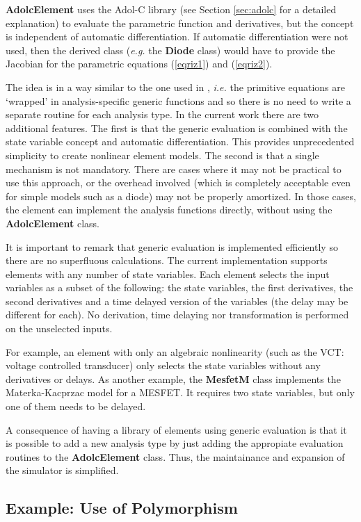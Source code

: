 {\bf AdolcElement} uses the Adol-C library (see Section
\ref{sec:adolc} for a detailed explanation) to evaluate the parametric
function and derivatives, but the concept is independent of automatic
differentiation. If automatic differentiation were not used, then the
derived class (\emph{e.g.} the {\bf Diode} class) would have to
provide the Jacobian for the parametric equations (\ref{eqriz1}) and
(\ref{eqriz2}).

The idea is in a way similar to the one used in \cite{aplac2},
\emph{i.e.} the primitive equations are `wrapped' in analysis-specific
generic functions and so there is no need to write a separate routine
for each analysis type. In the current work there are two additional
features. The first is that the generic evaluation is combined with
the state variable concept and automatic differentiation. This
provides unprecedented simplicity to create nonlinear element models.
The second is that a single mechanism is not mandatory. There are
cases where it may not be practical to use this approach, or the
overhead involved (which is completely acceptable even for simple
models such as a diode) may not be properly amortized. In those cases,
the element can implement the analysis functions directly, without
using the {\bf AdolcElement} class.

It is important to remark that generic evaluation is implemented
efficiently so there are no superfluous calculations. The current
implementation supports elements with any number of state
variables. Each element selects the input variables as a subset of the
following: the state variables, the first derivatives, the second
derivatives and a time delayed version of the variables (the delay may
be different for each). No derivation, time delaying nor
transformation is performed on the unselected inputs.

For example, an element with only an algebraic nonlinearity (such as
the VCT: voltage controlled transducer) only selects the state
variables without any derivatives or delays. As another example, the
{\bf MesfetM} class implements the Materka-Kacprzac model for a
MESFET. It requires two state variables, but only one of them needs to
be delayed.

A consequence of having a library of elements using generic evaluation
is that it is possible to add a new analysis type by just adding the
appropiate evaluation routines to the {\bf AdolcElement} class. Thus,
the maintainance and expansion of the simulator is simplified.

\subsection{Example: Use of Polymorphism}

